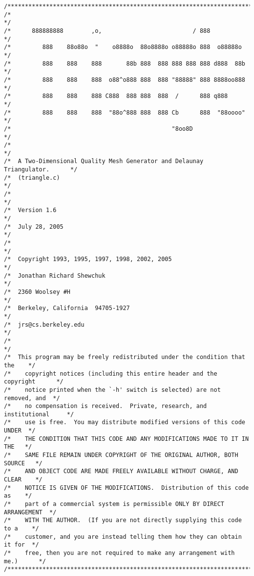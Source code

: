 \begin{itemize}
\begin{verbatim}
/*****************************************************************************/
/*                                                                           */
/*      888888888        ,o,                          / 888                  */
/*         888    88o88o  "    o8888o  88o8888o o88888o 888  o88888o         */
/*         888    888    888       88b 888  888 888 888 888 d888  88b        */
/*         888    888    888  o88^o888 888  888 "88888" 888 8888oo888        */
/*         888    888    888 C888  888 888  888  /      888 q888             */
/*         888    888    888  "88o^888 888  888 Cb      888  "88oooo"        */
/*                                              "8oo8D                       */
/*                                                                           */
/*  A Two-Dimensional Quality Mesh Generator and Delaunay Triangulator.      */
/*  (triangle.c)                                                             */
/*                                                                           */
/*  Version 1.6                                                              */
/*  July 28, 2005                                                            */
/*                                                                           */
/*  Copyright 1993, 1995, 1997, 1998, 2002, 2005                             */
/*  Jonathan Richard Shewchuk                                                */
/*  2360 Woolsey #H                                                          */
/*  Berkeley, California  94705-1927                                         */
/*  jrs@cs.berkeley.edu                                                      */
/*                                                                           */
/*  This program may be freely redistributed under the condition that the    */
/*    copyright notices (including this entire header and the copyright      */
/*    notice printed when the `-h' switch is selected) are not removed, and  */
/*    no compensation is received.  Private, research, and institutional     */
/*    use is free.  You may distribute modified versions of this code UNDER  */
/*    THE CONDITION THAT THIS CODE AND ANY MODIFICATIONS MADE TO IT IN THE   */
/*    SAME FILE REMAIN UNDER COPYRIGHT OF THE ORIGINAL AUTHOR, BOTH SOURCE   */
/*    AND OBJECT CODE ARE MADE FREELY AVAILABLE WITHOUT CHARGE, AND CLEAR    */
/*    NOTICE IS GIVEN OF THE MODIFICATIONS.  Distribution of this code as    */
/*    part of a commercial system is permissible ONLY BY DIRECT ARRANGEMENT  */
/*    WITH THE AUTHOR.  (If you are not directly supplying this code to a    */
/*    customer, and you are instead telling them how they can obtain it for  */
/*    free, then you are not required to make any arrangement with me.)      */
/*****************************************************************************/
\end{verbatim}


\end{itemize}
